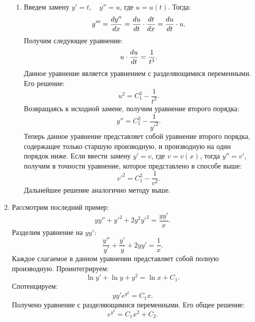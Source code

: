 \begin{enumerate}
\begin{enumerate}
					\item Введем замену $y' = t$, ~ $y'' = u$, где $u = u(t)$. Тогда:
						\[ y''' = \dfrac{d y''}{d x} = \dfrac{d u}{d t} \cdot \dfrac{d t}{d x} = \dfrac{d u}{d t} \cdot u. \]
						Получим следующее уравнение:
						\[ u \cdot \dfrac{d u}{d t} = \frac{1}{t^3}. \]
						Данное уравнение является уравнением с разделяющимися переменными. Его решение:
						\[ u^2 = C_1^2 - \frac{1}{t^2}. \]
						Возвращаясь к исходной замене, получим уравнение второго порядка:
						\[ y'' = C_1^2 - \frac{1}{y'^2}. \]
						Теперь данное уравнение представляет собой уравнение второго порядка, содержащее только старшую производную, и производную на один порядок ниже. Если ввести замену $y' = v$, где $v = v(x)$, тогда $y'' = v'$, получим в точности уравнение, которое представлено в способе выше:
						\[ v'^2 = C_1^2 - \frac{1}{v^2}. \]
						Дальнейшее решение аналогично методу выше.

				\end{enumerate}

			\item Рассмотрим последний пример:
				\[ yy'' + y'^2 + 2y^2 y'^2 = \frac{yy'}{x}. \]
				Разделим уравнение на $yy'$:
				\[ \frac{y''}{y'} + \frac{y'}{y} + 2yy' = \frac{1}{x}. \]
				Каждое слагаемое в данном уравнении представляет собой полную производную. Проинтегрируем:
				\[ \ln{y'} + \ln{y} + y^2 = \ln{x} + C_1. \]
				Спотенцируем:
				\[ yy' e^{y^2} = C_1 x. \]
				Получено уравнение с разделяющимися переменными. Его общее решение:
				\[ e^{y^2} = C_1 x^2 + C_2. \]

		\end{enumerate}
